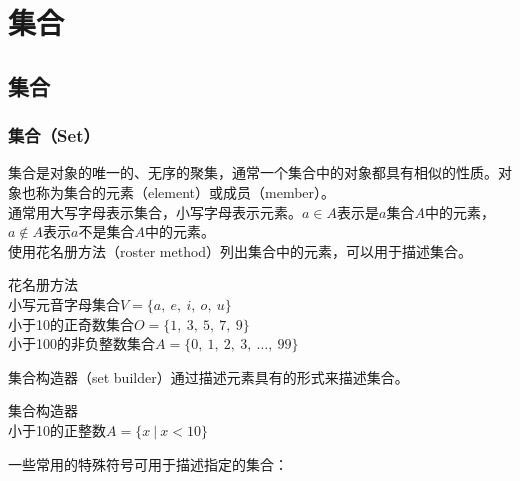 \chapter{集合}

\section{集合}

\subsection{集合（Set）}

集合是对象的唯一的、无序的聚集，通常一个集合中的对象都具有相似的性质。对象也称为集合的元素（element）或成员（member）。\\

通常用大写字母表示集合，小写字母表示元素。$ a \in A $表示是$ a $集合$ A $中的元素，$ a \notin A $表示$ a $不是集合$ A $中的元素。\\

使用花名册方法（roster method）列出集合中的元素，可以用于描述集合。

\begin{tcolorbox}
	花名册方法\\
	小写元音字母集合$ V = \{a,\ e,\ i,\ o,\ u\} $\\
	小于10的正奇数集合$ O = \{1,\ 3,\ 5,\ 7,\ 9\} $\\
	小于100的非负整数集合$ A = \{0,\ 1,\ 2,\ 3,\ \dots,\ 99\} $
\end{tcolorbox}

集合构造器（set builder）通过描述元素具有的形式来描述集合。

\begin{tcolorbox}
	集合构造器\\
	小于10的正整数$ A = \{x\ |\ x < 10\} $
\end{tcolorbox}

一些常用的特殊符号可用于描述指定的集合：

